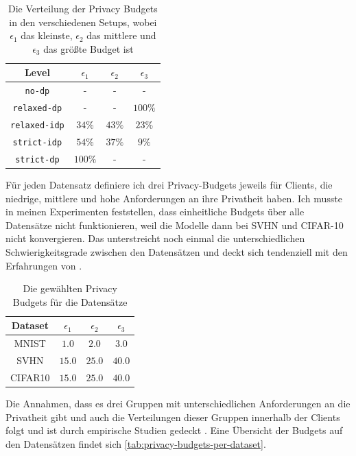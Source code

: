 \begin{table}[tb]
	\centering
	\begin{tabular}{cccc}
		\toprule
		Level & $\epsilon_1$ & $\epsilon_2$ & $\epsilon_3$ \\
		\midrule
		\texttt{no-dp} & - & - & - \\
		\texttt{relaxed-dp} & - & - & $100\%$ \\
		\texttt{relaxed-idp} & $34\%$ & $43\%$ & $23\%$ \\
		\texttt{strict-idp} & $54\%$ & $37\%$ & $9\%$ \\
		\texttt{strict-dp} & $100\%$ & - & - \\
		\bottomrule
	\end{tabular}
	\caption{Die Verteilung der Privacy Budgets in den verschiedenen Setups, wobei $\epsilon_1$ das kleinste, $\epsilon_2$ das mittlere und $\epsilon_3$ das größte Budget ist}
	\label{tab:privacy-niveau-distribution}
\end{table}

Für jeden Datensatz definiere ich drei Privacy-Budgets jeweils für Clients, die niedrige, mittlere und hohe Anforderungen an ihre Privatheit haben. Ich musste in meinen Experimenten feststellen, dass einheitliche Budgets über alle Datensätze nicht funktionieren, weil die Modelle dann bei SVHN und CIFAR-10 nicht konvergieren. Das unterstreicht noch einmal die unterschiedlichen Schwierigkeitsgrade zwischen den Datensätzen und deckt sich tendenziell mit den Erfahrungen von \textcite{sun:2021}.

\begin{table}[tb]
	\centering
	\begin{tabular}{cccc}
		\toprule
		Dataset & $\epsilon_1$ & $\epsilon_2$ & $\epsilon_3$ \\
		\midrule
		MNIST & $1.0$ & $2.0$ & $3.0$ \\
		SVHN & $15.0$ & $25.0$ & $40.0$ \\
		CIFAR10 & $15.0$ & $25.0$ & $40.0$ \\
		\bottomrule
	\end{tabular}
	\caption{Die gewählten Privacy Budgets für die Datensätze}
	\label{tab:privacy-budgets-per-dataset}
\end{table}

Die Annahmen, dass es drei Gruppen mit unterschiedlichen Anforderungen an die Privatheit gibt und auch die Verteilungen dieser Gruppen innerhalb der Clients folgt \textcite{boenisch:2023} und ist durch empirische Studien gedeckt \cite{jensen:2005, acquisti:2005}. Eine Übersicht der Budgets auf den Datensätzen findet sich \autoref{tab:privacy-budgets-per-dataset}.

